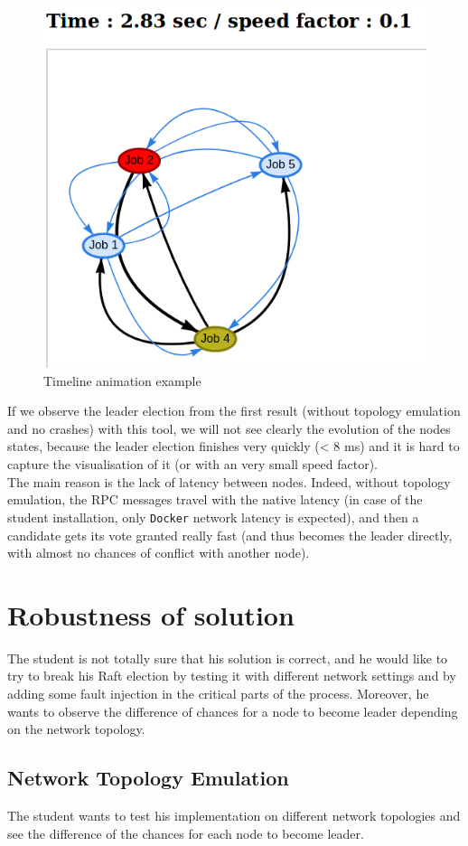 \documentclass{eplmastersthesis}
\begin{document}
      \begin{figure}[H]
        \centering
        \includegraphics[width=0.4\linewidth]{figures/user_case/anim_pres.png}
        \caption{Timeline animation example}
        \label{fig:timeline}
      \end{figure}

      If we observe the leader election from the first result (without
      topology emulation and no crashes) with this tool, we will not see clearly
      the evolution of the nodes states, because the leader election finishes
      very quickly (< 8 ms) and it is hard to capture the visualisation of it
      (or with an very small speed factor).\\
      The main reason is the lack of latency between nodes. Indeed, without
      topology emulation, the RPC messages travel with the native latency
      (in case of the student installation, only \texttt{Docker} network latency is
      expected), and then a candidate gets its vote granted really fast (and
      thus becomes the leader directly, with almost no chances of conflict
      with another node).

    \section{Robustness of solution}

      The student is not totally sure that his solution is correct, and he would
      like to try to break his Raft election by testing it with different
      network settings and by adding some fault injection in the critical
      parts of the process. Moreover, he wants to observe the difference of
      chances for a node to become leader depending on the network topology.

      \subsection{Network Topology Emulation}

        The student wants to test his implementation on different network
        topologies and see the difference of the chances for each node to
        become leader.
\end{document}
